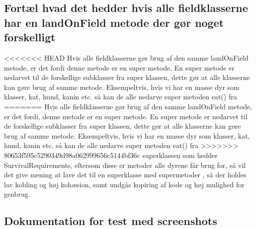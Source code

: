 \subsection{Fortæl hvad det hedder hvis alle fieldklasserne har en landOnField metode der gør noget forskelligt}

<<<<<<< HEAD
Hvis alle fieldklasserne gør brug af den samme landOnField metode, er det fordi denne metode er en super metode. En super metode er nedarvet til de forskellige subklasser fra super klassen, dette gør at alle klasserne kan gøre brug af samme metode. Eksempeltvis, hvis vi har en masse dyr som klasser, kat, hund, kanin etc. så kan de alle nedarve super metoden eat() fra 
=======
Hvis alle fieldklasserne gør brug af den samme landOnField metode, er det fordi, denne metode er en super metode. En super metode er nedarvet til de forskellige subklasser fra super klassen, dette gør at alle klasserne kan gøre brug af samme metode. Eksempeltvis, hvis vi har en masse dyr som klasser, kat, hund, kanin etc. så kan de alle nedarve super metoden eat() fra 
>>>>>>> 80653f595c5290349d98a062999656c5144bf36c
superklassen som hedder SurvivalRequirements, eftersom disse er metoder alle dyrene får brug for, så vil det give mening at lave det til en superklasse med supermetoder
, så der holdes lav kobling og høj kohæsion, samt undgås kopiring af kode og høj mulighed for genbrug.

\subsection{Dokumentation for test med screenshots}
